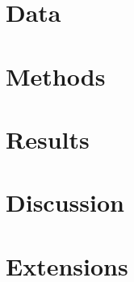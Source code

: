 \documentclass{article}
\begin{document}
\section{Data}

\section{Methods}

\section{Results}

\section{Discussion}

\section{Extensions}
\end{document}
